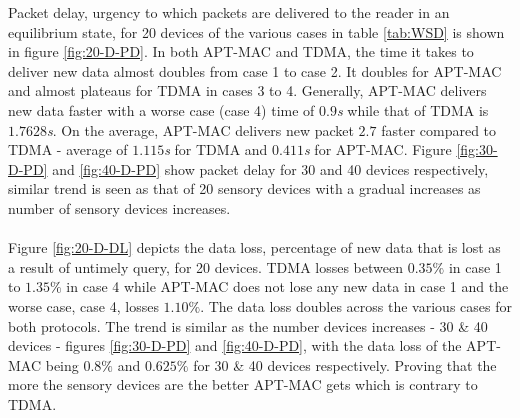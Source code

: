 Packet delay, urgency to which packets are delivered to the reader in an equilibrium
state, for 20 devices of the various cases in table \ref{tab:WSD} is shown in figure
\ref{fig:20-D-PD}.
In both APT-MAC and TDMA, the time it takes to deliver new data
almost doubles from case 1 to case 2. It doubles for APT-MAC and almost plateaus for
TDMA in cases 3 to 4. Generally, APT-MAC delivers new data faster with a worse case
(case 4) time of $0.9$\textit{s} while that of TDMA is $1.7628$\textit{s}. On the
average, APT-MAC delivers new packet $2.7$ faster compared to TDMA - average of
$1.115$\textit{s} for TDMA and $0.411$\textit{s} for APT-MAC. Figure
\ref{fig:30-D-PD} and \ref{fig:40-D-PD} show packet delay for 30 and 40 devices 
respectively, similar trend is seen as that of 20 sensory devices with a gradual
increases as number of sensory devices increases.\\\\
Figure \ref{fig:20-D-DL} depicts the data loss, percentage of new data that is lost
as a result of untimely query, for 20 devices.
TDMA losses between $0.35\%$ in case 1 to $1.35\%$ in case 4 while APT-MAC does not
lose any new data in case 1 and the worse case, case 4, losses $1.10\%$. The data
loss doubles across the various cases for both protocols. The trend is similar as the
number devices increases - 30 \& 40 devices - figures \ref{fig:30-D-PD} and
\ref{fig:40-D-PD}, with the data loss of the APT-MAC being $0.8\%$ and $0.625\%$ for
30 \& 40 devices respectively. Proving that the more the sensory devices are the
better APT-MAC gets which is contrary to TDMA.


























